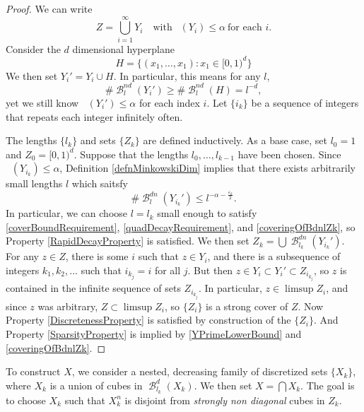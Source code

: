 \documentclass[dvipsnames,letterpaper,12pt]{article}
\numberwithin{equation}{section}
\theoremstyle{plain}
\theoremstyle{remark}
\DeclareMathOperator{\lowminkdim}{\underline{\dim}_{\mathbf{M}}}
\DeclareMathOperator{\B}{\mathcal{B}}
\begin{document}
\begin{proof}
	We can write
	\[ Z = \bigcup_{i = 1}^\infty Y_i \quad \text{with}\ \lowminkdim(Y_i) \leq \alpha\ \text{for each $i$}. \]
	Consider the $d$ dimensional hyperplane
	\[ H = \{ (x_1,\dots, x_1) : x_1 \in [0,1)^d \} \]
	We then set $Y_i' = Y_i \cup H$. In particular, this means for any $l$,
	\begin{equation}\label{YPrimeLowerBound}
		\# \B^{nd}_l(Y_i') \geq \# \B^{nd}_l(H) = l^{-d},
	\end{equation}
	yet we still know $\lowminkdim(Y_i') \leq \alpha$ for each index $i$. Let $\{ i_k \}$ be a sequence of integers that repeats each integer infinitely often.

	The lengths $\{ l_k \}$ and sets $\{ Z_k \}$ are defined inductively. As a base case, set $l_0 = 1$ and $Z_0 = [0,1)^d$. Suppose that the lengths $l_0, \ldots, l_{k-1}$ have been chosen. Since $\lowminkdim(Y_{i_k}) \leq \alpha$, Definition \ref{defnMinkowskiDim} implies that there exists arbitrarily small lengths $l$ which saitsfy
	\begin{equation}\label{coveringOfBdnlZk}
		\# \B^{dn}_l(Y_{i_k}') \leq l^{-\alpha - \frac{\varepsilon_k}{2}}.
	\end{equation}
	In particular, we can choose $l = l_k$ small enough to satisfy \eqref{coverBoundRequirement}, \eqref{quadDecayRequirement}, and \eqref{coveringOfBdnlZk}, so Property \ref{RapidDecayProperty} is satisfied. We then set $Z_k = \bigcup \B^{dn}_{l_k}(Y_{i_k}')$. For any $z \in Z$, there is some $i$ such that $z \in Y_i$, and there is a subsequence of integers $k_1, k_2, \dots$ such that $i_{k_j} = i$ for all $j$. But then $z \in Y_i \subset Y_i' \subset Z_{i_{k_j}}$, so $z$ is contained in the infinite sequence of sets $Z_{i_{k_j}}$. In particular, $z \in \limsup Z_i$, and since $z$ was arbitrary, $Z \subset \limsup Z_i$, so $\{ Z_i \}$ is a strong cover of $Z$. Now Property \ref{DiscretenessProperty} is satisfied by construction of the $\{ Z_i \}$. And Property \ref{SparsityProperty} is implied by \eqref{YPrimeLowerBound} and \eqref{coveringOfBdnlZk}.
\end{proof}

To construct $X$, we consider a nested, decreasing family of discretized sets $\{ X_k \}$, where $X_k$ is a union of cubes in $\B^d_{l_k}(X_k)$. We then set $X = \bigcap X_k$. The goal is to choose $X_k$ such that $X_k^n$ is disjoint from {\it strongly non diagonal} cubes in $Z_k$.
\end{document}
